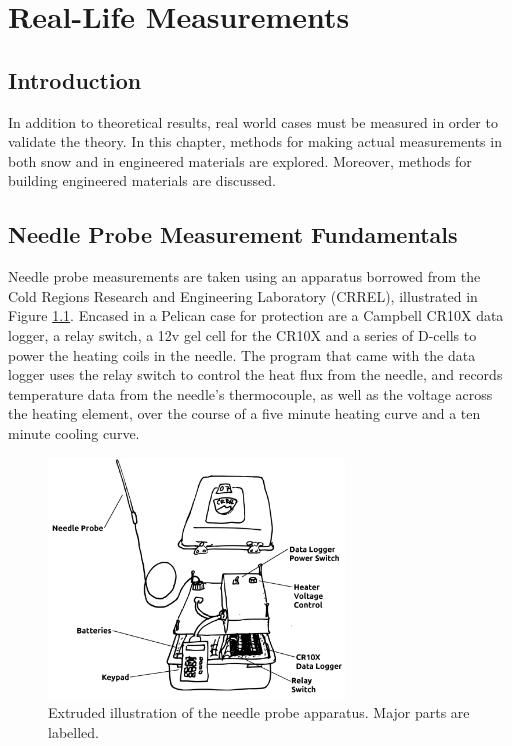 \chapter{Real-Life Measurements}
\label{sec:irl}

\section{Introduction}

In addition to theoretical results, real world cases must be measured
in order to validate the theory. In this chapter, methods for making actual
measurements in both snow and in engineered materials are explored. Moreover,
methods for building engineered materials are discussed.


\section{Needle Probe Measurement Fundamentals}

Needle probe measurements are taken using an apparatus borrowed from the Cold
Regions Research and Engineering Laboratory (CRREL), illustrated in Figure
\ref{fig:apparatus}. Encased in a Pelican case for protection are a Campbell
CR10X data logger, a relay switch, a 12v gel cell for the CR10X and a series of
D-cells to power the heating coils in the needle. The program that came with the
data logger uses the relay switch to control the heat flux from the needle, and
records temperature data from the needle's thermocouple, as well as the voltage
across the heating element, over the course of a five minute heating curve and
a ten minute cooling curve.

\begin{figure}[h]
\centering
\includegraphics[width=0.7\textwidth]{fig/apparatus.png}
\caption{Extruded illustration of the needle probe apparatus. Major parts are labelled.}
\label{fig:apparatus}
\end{figure}

